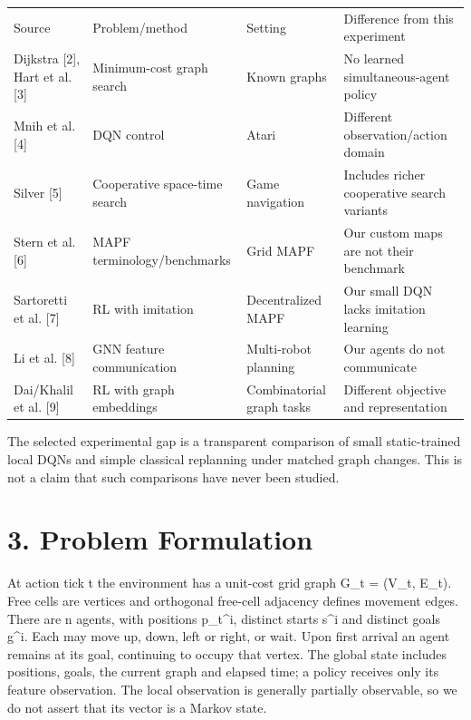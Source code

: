 \documentclass[10pt,a4paper]{article}
\begin{document}
{\footnotesize\begin{longtable}{p{}p{}p{}p{}}
Source & Problem/method & Setting & Difference from this experiment \\
Dijkstra [2], Hart et al. [3] & Minimum-cost graph search & Known graphs & No learned simultaneous-agent policy \\
Mnih et al. [4] & DQN control & Atari & Different observation/action domain \\
Silver [5] & Cooperative space-time search & Game navigation & Includes richer cooperative search variants \\
Stern et al. [6] & MAPF terminology/benchmarks & Grid MAPF & Our custom maps are not their benchmark \\
Sartoretti et al. [7] & RL with imitation & Decentralized MAPF & Our small DQN lacks imitation learning \\
Li et al. [8] & GNN feature communication & Multi-robot planning & Our agents do not communicate \\
Dai/Khalil et al. [9] & RL with graph embeddings & Combinatorial graph tasks & Different objective and representation \\
\end{longtable}}

The selected experimental gap is a transparent comparison of small
static-trained local DQNs and simple classical replanning under matched graph
changes. This is not a claim that such comparisons have never been studied.

\section*{3. Problem Formulation}

At action tick t the environment has a unit-cost grid graph G\_t = (V\_t, E\_t).
Free cells are vertices and orthogonal free-cell adjacency defines movement
edges. There are n agents, with positions p\_t\textasciicircum{}i, distinct starts s\textasciicircum{}i and distinct
goals g\textasciicircum{}i. Each may move up, down, left or right, or wait. Upon first arrival an
agent remains at its goal, continuing to occupy that vertex. The global state
includes positions, goals, the current graph and elapsed time; a policy receives
only its feature observation. The local observation is generally partially
observable, so we do not assert that its vector is a Markov state.
\end{document}
